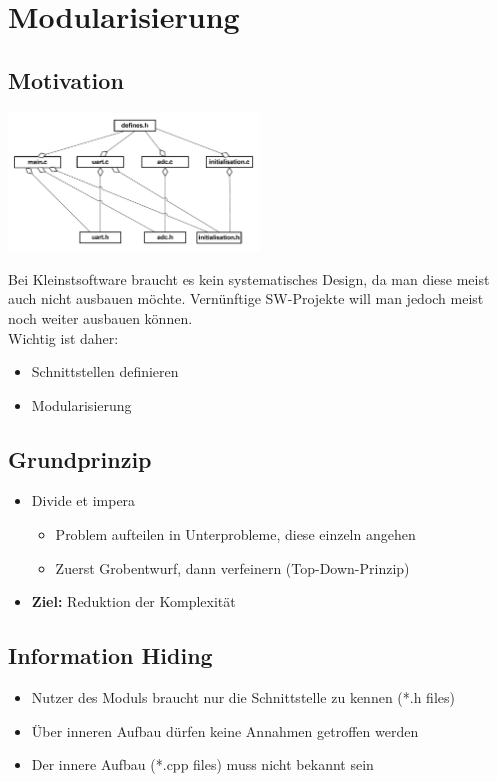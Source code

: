 \section{Modularisierung}
\subsection{Motivation }
\begin{center}
{\includegraphics[width=0.5\textwidth]{images/Modularisierung/SchlechtesBeispielModularisierung.png}}
\end{center}
Bei Kleinstsoftware braucht es kein systematisches Design, da man diese meist
auch nicht ausbauen möchte. Vernünftige SW-Projekte will man jedoch meist noch
weiter ausbauen können.\\
Wichtig ist daher:\\
\begin{itemize}
  \item Schnittstellen definieren
  \item Modularisierung
\end {itemize}
\subsection{Grundprinzip}
\begin{itemize}
  \item Divide et impera
  \begin{itemize}
    \item Problem aufteilen in Unterprobleme, diese einzeln angehen
    \item Zuerst Grobentwurf, dann verfeinern (Top-Down-Prinzip)
  \end{itemize}
  \item \textbf{Ziel:} Reduktion der Komplexität
\end{itemize}
\subsection{Information Hiding}
\begin{itemize}
  \item Nutzer des Moduls braucht nur die Schnittstelle zu kennen (*.h files)
  \item Über inneren Aufbau dürfen keine Annahmen getroffen werden
  \item Der innere Aufbau (*.cpp files) muss nicht bekannt sein
\end{itemize}
